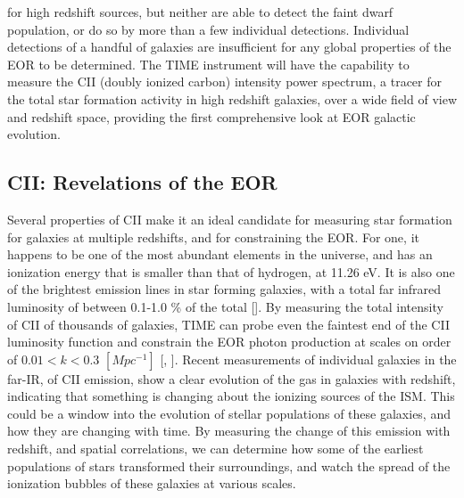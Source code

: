 \documentclass[manuscript]{aastex}
\begin{document}
for high redshift sources, but neither are able to detect the faint dwarf population, or do so by more than a few individual detections. Individual detections of a handful of galaxies are insufficient for any global properties of the EOR to be determined. The TIME instrument will have the capability to measure the CII (doubly ionized carbon) intensity power spectrum, a tracer for the total star formation activity in high redshift galaxies, over a wide field of view and redshift space, providing the first comprehensive look at EOR galactic evolution. 

\subsection{CII: Revelations of the EOR}
Several properties of CII make it an ideal candidate for measuring star formation for galaxies at multiple redshifts, and for constraining the EOR. For one, it happens to be one of the most abundant elements in the universe, and has an ionization energy that is smaller than that of hydrogen, at 11.26 eV. It is also one of the brightest emission lines in star forming galaxies, with a total far infrared luminosity of between 0.1-1.0 \% of the total [\cite{Stacey1991}]. By measuring the total intensity of CII of thousands of galaxies, TIME can probe even the faintest end of the CII luminosity function and constrain the EOR photon production at scales on order of  $0.01 < k < 0.3$  $[Mpc^{-1}]$  [\cite{Gong2012}, \cite{Crites2014}]. Recent measurements of individual galaxies in the far-IR, of CII emission, show a clear evolution of the gas in galaxies with redshift, indicating that something is changing about the ionizing sources of the ISM. This could be a window into the evolution of stellar populations of these galaxies, and how they are changing with time. By measuring the change of this emission with redshift, and spatial correlations, we can determine how some of the earliest populations of stars transformed their surroundings, and watch the spread of the ionization bubbles of these galaxies at various scales. 
\end{document}
